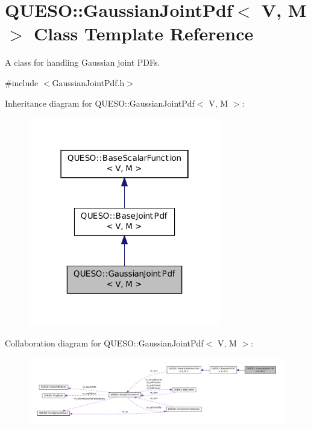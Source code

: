 \hypertarget{class_q_u_e_s_o_1_1_gaussian_joint_pdf}{\section{Q\-U\-E\-S\-O\-:\-:Gaussian\-Joint\-Pdf$<$ V, M $>$ Class Template Reference}
\label{class_q_u_e_s_o_1_1_gaussian_joint_pdf}
}


A class for handling Gaussian joint P\-D\-Fs.  




{\ttfamily \#include $<$Gaussian\-Joint\-Pdf.\-h$>$}



Inheritance diagram for Q\-U\-E\-S\-O\-:\-:Gaussian\-Joint\-Pdf$<$ V, M $>$\-:
\nopagebreak
\begin{figure}[H]
\begin{center}
\leavevmode
\includegraphics[width=238pt]{class_q_u_e_s_o_1_1_gaussian_joint_pdf__inherit__graph}
\end{center}
\end{figure}


Collaboration diagram for Q\-U\-E\-S\-O\-:\-:Gaussian\-Joint\-Pdf$<$ V, M $>$\-:
\nopagebreak
\begin{figure}[H]
\begin{center}
\leavevmode
\includegraphics[width=350pt]{class_q_u_e_s_o_1_1_gaussian_joint_pdf__coll__graph}
\end{center}
\end{figure}
